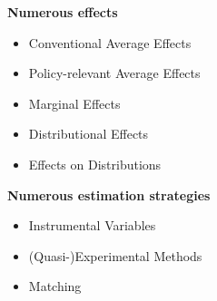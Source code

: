 \begin{frame}
\textbf{Numerous effects}\\\vspace{0.3cm}
	\begin{itemize}\setlength\itemsep{1em}
		\item Conventional Average Effects
		\item Policy-relevant Average Effects
		\item Marginal Effects
		\item Distributional Effects
		\item Effects on Distributions
	\end{itemize}
\end{frame}
\begin{frame}
\textbf{Numerous estimation strategies}\\\vspace{0.3cm}
	\begin{itemize}\setlength\itemsep{1em}
		\item Instrumental Variables
		\item (Quasi-)Experimental Methods
		\item Matching
	\end{itemize}
\end{frame}
